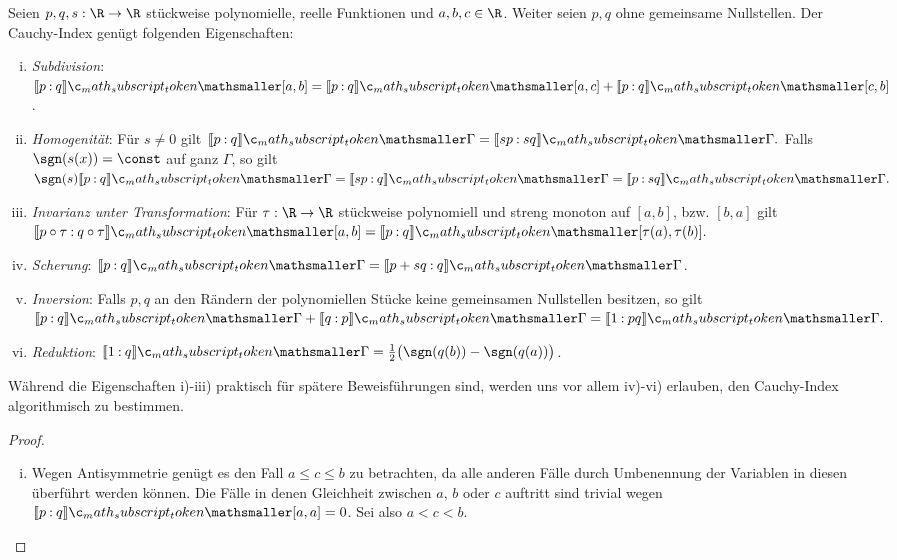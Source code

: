 \documentclass{mythesis}
\begin{document}
\begin{proposition} \label{thm:prop:ci_prop}
    Seien $p, q, s: \R \to \R$ stückweise polynomielle, reelle Funktionen und $a, b, c \in \R$.
    Weiter seien $p, q$ ohne gemeinsame Nullstellen.
    Der Cauchy-Index genügt folgenden Eigenschaften:
    \begin{enumerate}[i)]
        \item
            \emph{Subdivision}: $\Index{[a,b]}{p}{q} = \Index{[a,c]}{p}{q} + \Index{[c,b]}{p}{q}$.
        \item
            \emph{Homogenität}: Für $s \neq 0$ gilt
            \begin{math}
                \Index{\Gamma}{p}{q} = \Index{\Gamma}{sp}{sq}.
            \end{math}
            Falls $\sgn(s(x)) = \const$ auf ganz $\Gamma$, so gilt
            \begin{math}
                \sgn(s) \Index{\Gamma}{p}{q} = \Index{\Gamma}{sp}{q} = \Index{\Gamma}{p}{sq}.
            \end{math}
        \item
            \emph{Invarianz unter Transformation}: Für $\tau: \R \to \R$ stückweise polynomiell und streng monoton auf $[a, b]$, bzw. $[b, a]$ gilt
            \begin{math}[numbered] \label{eq:cauchy-index_transformation}
                \Index{[a,b]}{p\circ\tau }{ q\circ\tau} = \Index{[\tau(a),\tau(b)]}{p}{q}.
            \end{math}
        \item
            \emph{Scherung}: $\Index{\Gamma}{p}{q} = \Index{\Gamma}{p + sq }{ q}$.
        \item
            \emph{Inversion}: Falls $p, q$ an den Rändern der polynomiellen Stücke keine gemeinsamen Nullstellen besitzen, so gilt
            \begin{math}
                \Index{\Gamma}{p}{q} + \Index{\Gamma}{q}{p} = \Index{\Gamma}{1}{pq}.
            \end{math}
        \item
            \emph{Reduktion}: $\Index{\Gamma}{1}{q} = \frac{1}{2}\big(\sgn(q(b)) - \sgn(q(a))\big)$.
    \end{enumerate}
    \begin{note}
        Während die Eigenschaften i)-iii) praktisch für spätere Beweisführungen sind, werden uns vor allem iv)-vi) erlauben, den Cauchy-Index algorithmisch zu bestimmen.
    \end{note}
    \begin{proof}
        \begin{enumerate}[i)]
            \item
                Wegen Antisymmetrie genügt es den Fall $a \le c \le b$ zu betrachten, da alle anderen Fälle durch Umbenennung der Variablen in diesen überführt werden können.
                Die Fälle in denen Gleichheit zwischen $a$, $b$ oder $c$ auftritt sind trivial wegen $\Index{[a,a]}{p}{q} = 0$.
                Sei also $a < c < b$.


\end{enumerate}
\end{proof}
\end{proposition}
\end{document}
